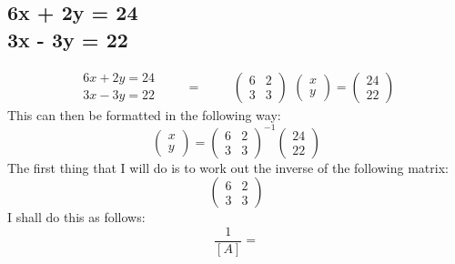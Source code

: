 \documentclass[a4paper,10pt]{article}
\begin{document}
      \newpage

      \subsection{6x + 2y = 24\\3x - 3y = 22}
      \[
        \begin{split}
          6x + 2y = 24\\3x - 3y = 22
        \end{split}
        \qquad
        =
        \qquad
        \begin{split}
          \begin{pmatrix}
            6 & 2\\3 & 3
          \end{pmatrix}
        \end{split}
        \begin{pmatrix}
          x\\y
        \end{pmatrix}
        =
        \begin{pmatrix}
          24\\22
        \end{pmatrix}
      \]
      This can then be formatted in the following way:
      \begin{equation*}
        \begin{pmatrix}
          x\\y
        \end{pmatrix}
        =
        \begin{pmatrix}
          6 & 2\\3 & 3
        \end{pmatrix}
        ^{-1}
        \begin{pmatrix}
          24\\22
        \end{pmatrix}
      \end{equation*}
      The first thing that I will do is to work out the inverse of the following matrix:
      \begin{equation*}
         \begin{pmatrix}
           6 & 2\\3 & 3
         \end{pmatrix}
      \end{equation*}
      I shall do this as follows:
      \begin{equation*}
        \frac{1}{[A]}
        =
      \end{equation*}
\end{document}
